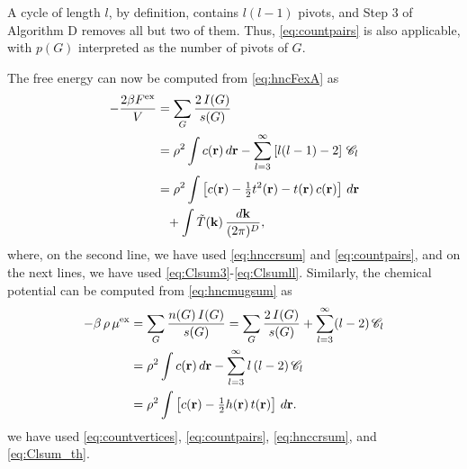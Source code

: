 \documentclass[preprint]{revtex4-1}
\newcommand{\vct}[1]{\mathbf{#1}}
\providecommand{\vr}{} %
\renewcommand{\vr}{\vct{r}}
\newcommand{\vk}{\vct{k}}
\newcommand{\dvk}{\frac{d\vk}{(2\pi)^D}}
\newcommand{\supex}[1]{ { { #1 }^{ \mathrm{ex} } } }
\newcommand{\Fex}{\supex{F}}
\newcommand{\muex}{\supex{\mu}}
\newcommand{\Chn}{\mathscr{C}}
\newcommand{\A}{\mathcal{A}}
\begin{document}
A cycle of length $l$, by definition,
  contains $l (l - 1)$ pivots,
  and Step 3 of Algorithm D
  removes all but two of them.
%
Thus, \eqref{eq:countpairs}
  is also applicable, with $p(G)$ interpreted
  as the number of pivots of $G$.



The free energy can now be computed from \eqref{eq:hncFexA}
as\cite{morita1958, *morita1959, *morita1960, singer1985}
%
\begin{align}
    - \frac{ 2 \beta \Fex } { V }
  &=
      \sum_G \frac{ 2 \, I(G) } { s(G) }
      \notag \\
  &=
      \rho^2 \int c(\vr) \, d\vr
    - \sum_{l = 3}^\infty \left[ l(l-1) - 2 \right] \, \Chn_l
      \notag \\
  &=
      \rho^2 \int \left[ c(\vr) - \tfrac{1}{2} t^2(\vr) - t(\vr) \, c(\vr) \right] \, d\vr
      \notag \\
  & \hphantom{=}
      + \int  \tilde{T}(\vk) \, \dvk,
\label{eq:hncF}
\end{align}
%
where,
  on the second line,
  we have used \eqref{eq:hnccrsum} and \eqref{eq:countpairs},
  and on the next lines,
  we have used \eqref{eq:Clsum3}-\eqref{eq:Clsumll}.
%
Similarly, the chemical potential
  can be computed from \eqref{eq:hncmugsum}
  as \cite{morita1958, *morita1959, *morita1960, singer1985}
%
\begin{align}
    - \beta \, \rho \, \muex
  &=
      \sum_G \frac{ n(G) \, I(G) } { s(G) }
  =
      \sum_G \frac{ 2 \, I(G) } { s(G) }
    + \sum_{l = 3}^\infty (l-2) \, \Chn_l
      \notag \\
  &=
      \rho^2 \int c(\vr) \, d\vr
    - \sum_{l = 3}^\infty l \, (l-2) \, \Chn_l
      \notag \\
  &=
      \rho^2 \int \left[ c(\vr) - \tfrac{1}{2} h(\vr) \, t(\vr) \right] \, d\vr.
\label{eq:hncmu}
\end{align}
%
we have used \eqref{eq:countvertices}, \eqref{eq:countpairs},
\eqref{eq:hnccrsum}, and \eqref{eq:Clsum_th}.
\end{document}
